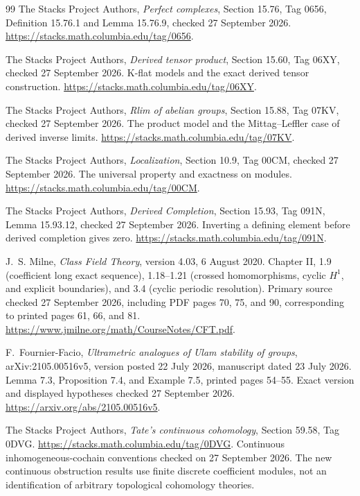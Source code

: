 \documentclass[11pt]{article}
\theoremstyle{definition}
\theoremstyle{remark}
\begin{document}
\begin{thebibliography}{99}
The Stacks Project Authors,
\emph{Perfect complexes}, Section 15.76, Tag 0656,
Definition 15.76.1 and Lemma 15.76.9, checked 27 September 2026.
\url{https://stacks.math.columbia.edu/tag/0656}.

The Stacks Project Authors,
\emph{Derived tensor product}, Section 15.60, Tag 06XY,
checked 27 September 2026. K-flat models and the exact derived tensor construction.
\url{https://stacks.math.columbia.edu/tag/06XY}.

The Stacks Project Authors,
\emph{Rlim of abelian groups}, Section 15.88, Tag 07KV,
checked 27 September 2026. The product model and the Mittag--Leffler case of derived inverse limits.
\url{https://stacks.math.columbia.edu/tag/07KV}.

The Stacks Project Authors,
\emph{Localization}, Section 10.9, Tag 00CM,
checked 27 September 2026. The universal property and exactness on modules.
\url{https://stacks.math.columbia.edu/tag/00CM}.

The Stacks Project Authors,
\emph{Derived Completion}, Section 15.93, Tag 091N,
Lemma 15.93.12, checked 27 September 2026. Inverting a defining element before derived completion gives zero.
\url{https://stacks.math.columbia.edu/tag/091N}.

J.~S. Milne, \emph{Class Field Theory}, version 4.03, 6 August 2020.
Chapter II, 1.9 (coefficient long exact sequence), 1.18--1.21 (crossed homomorphisms, cyclic $H^1$, and explicit boundaries), and 3.4 (cyclic periodic resolution). Primary source checked 27 September 2026, including PDF pages 70, 75, and 90, corresponding to printed pages 61, 66, and 81.
\url{https://www.jmilne.org/math/CourseNotes/CFT.pdf}.

F.~Fournier-Facio, \emph{Ultrametric analogues of Ulam stability of groups},
arXiv:2105.00516v5, version posted 22 July 2026, manuscript dated 23 July 2026.
Lemma 7.3, Proposition 7.4, and Example 7.5, printed pages 54--55. Exact version and displayed hypotheses checked 27 September 2026.
\url{https://arxiv.org/abs/2105.00516v5}.


The Stacks Project Authors,
\emph{Tate's continuous cohomology}, Section 59.58, Tag 0DVG.
\url{https://stacks.math.columbia.edu/tag/0DVG}.
Continuous inhomogeneous-cochain conventions checked on 27 September 2026. The new continuous obstruction results use finite discrete coefficient modules, not an identification of arbitrary topological cohomology theories.

\end{thebibliography}
\end{document}
